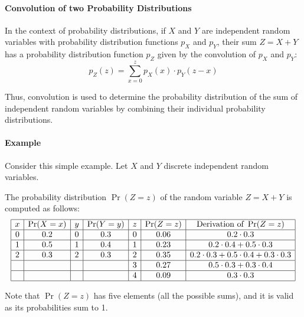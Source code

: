 \documentclass{masterthesis}
\begin{document}
\paragraph*{Convolution of two Probability Distributions}
In the context of probability distributions, if \(X\) and \(Y\) are independent random variables with probability distribution functions \(p_X\) and \(p_Y\), their sum \(Z = X + Y\) has a probability distribution function \(p_Z\) given by the convolution of \(p_X\) and \(p_Y\):
\begin{equation}\label{eq:convolution}
    p_Z(z) = \sum_{x=0}^{z} p_X(x) \cdot p_Y(z - x)
\end{equation}

Thus, convolution is used to determine the probability distribution of the sum of independent random variables by combining their individual probability distributions.

\paragraph*{Example} 

Consider this simple example. Let $X$ and $Y$ discrete independent random variables. 

The probability distribution $\Pr(Z = z)$ of the random variable $Z = X + Y$ is computed as follows:
\begin{equation*}\label{eq:convolution_example}
    \begin{array}{|c|c|c|c|c|c|c|}
        \hline
        x & \Pr(X = x) & y & \Pr(Y = y) & z & \Pr(Z = z) & \text{Derivation of }\Pr(Z = z)\\
        \hline
        0 & 0.2 & 0 & 0.3 & 0 & 0.06 & 0.2 \cdot 0.3 \\
        \hline
        1 & 0.5 & 1 & 0.4 & 1 & 0.23 & 0.2 \cdot 0.4 + 0.5 \cdot 0.3 \\
        \hline
        2 & 0.3 & 2 & 0.3 & 2 & 0.35 & 0.2 \cdot 0.3 + 0.5 \cdot 0.4 + 0.3 \cdot 0.3 \\
        \hline
         &  &  &  & 3 & 0.27 & 0.5 \cdot 0.3 + 0.3 \cdot 0.4 \\
        \hline
         &  &  &  & 4 & 0.09 & 0.3 \cdot 0.3 \\
        \hline
    \end{array}
\end{equation*}

Note that $\Pr(Z = z)$ has five elements (all the possible sums), and it is valid as its probabilities sum to 1.
\end{document}
